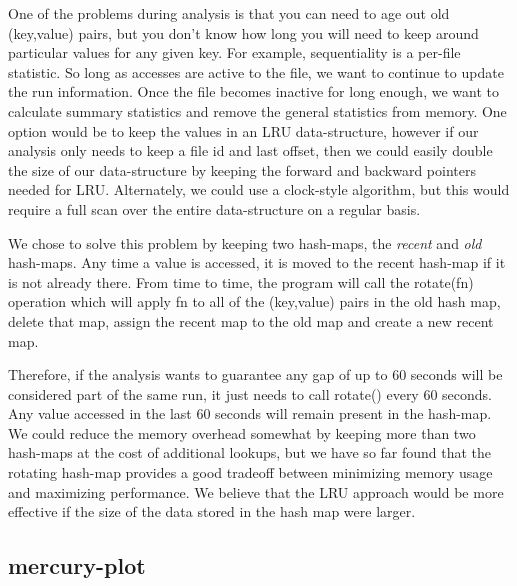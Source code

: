 
One of the problems during analysis is that you can need to age out
old (key,value) pairs, but you don't know how long you will need to
keep around particular values for any given key.  For example,
sequentiality is a per-file statistic.  So long as accesses are active
to the file, we want to continue to update the run information.  Once
the file becomes inactive for long enough, we want to calculate
summary statistics and remove the general statistics from memory.  One
option would be to keep the values in an LRU data-structure, however if
our analysis only needs to keep a file id and last offset, then we
could easily double the size of our data-structure by keeping the
forward and backward pointers needed for LRU.  Alternately, we could
use a clock-style algorithm, but this would require a full scan over
the entire data-structure on a regular basis.

We chose to solve this problem by keeping two hash-maps, the {\it
recent} and {\it old} hash-maps.  Any time a value is accessed, it is
moved to the recent hash-map if it is not already there.  From time to
time, the program will call the rotate(fn) operation which will apply
fn to all of the (key,value) pairs in the old hash map, delete that map,
assign the recent map to the old map and create a new recent map.

Therefore, if the analysis wants to guarantee any gap of up to 60
seconds will be considered part of the same run, it just needs to call
rotate() every 60 seconds.  Any value accessed in the last 60 seconds
will remain present in the hash-map.  We could reduce the memory
overhead somewhat by keeping more than two hash-maps at the cost of
additional lookups, but we have so far found that the rotating
hash-map provides a good tradeoff between minimizing memory usage and
maximizing performance.  We believe that the LRU approach would be
more effective if the size of the data stored in the hash map were
larger.

\subsection{mercury-plot}


